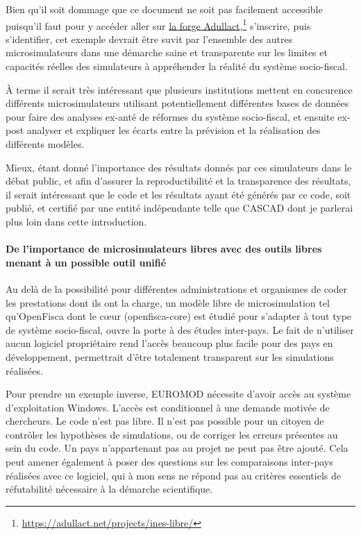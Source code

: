 Bien qu'il soit dommage que ce document ne soit pas facilement
accessible puisqu'il faut pour y accéder aller sur
\href{https://adullact.net/projects/ines-libre/}{la forge Adullact},\footnote{\url{https://adullact.net/projects/ines-libre/}}
s'inscrire, puis s'identifier, cet exemple devrait être suvit par
l'ensemble des autres microsimulateurs dans une démarche saine et
transparente sur les limites et capacités réelles des simulateurs à
appréhender la réalité du système socio-fiscal.

À terme il serait très intéressant que plusieurs institutions mettent en
concurence différents microsimulateurs utilisant potentiellement
différentes bases de données pour faire des analyses ex-anté de réformes
du système socio-fiscal, et ensuite ex-post analyser et expliquer les
écarts entre la prévision et la réalisation des différents modèles.

Mieux, étant donné l'importance des résultats donnés par ces simulateurs
dans le débat public, et afin d'assurer la reproductibilité et la
transparence des résultats, il serait intéressant que le code et les
résultats ayant été générés par ce code, soit publié, et certifié par
une entité indépendante telle que CASCAD dont je parlerai plus loin dans
cette introduction.

\paragraph{De l'importance de microsimulateurs libres avec des outils
libres menant à un possible outil
unifié}

Au delà de la possibilité pour différentes administrations et organismes
de coder les prestations dont ils ont la charge, un modèle libre de
microsimulation tel qu'OpenFisca dont le cœur (openfisca-core) est
étudié pour s'adapter à tout type de système socio-fiscal, ouvre la
porte à des études inter-pays. Le fait de n'utiliser aucun logiciel
propriétaire rend l'accès beaucoup plus facile pour des pays en
développement, permettrait d'être totalement transparent sur les
simulations réalisées.

Pour prendre un exemple inverse, EUROMOD nécessite d'avoir accès au
système d'exploi\-tation Windows. L'accès est conditionnel à une demande
motivée de chercheurs. Le code n'est pas libre. Il n'est pas possible
pour un citoyen de contrôler les hypothèses de simulations, ou de
corriger les erreurs présentes au sein du code. Un pays n'appartenant
pas au projet ne peut pas être ajouté. Cela peut amener également à
poser des questions sur les comparaisons inter-pays réalisées avec ce
logiciel, qui à mon sens ne répond pas au critères essentiels de
réfutabilité nécessaire à la démarche scientifique.

